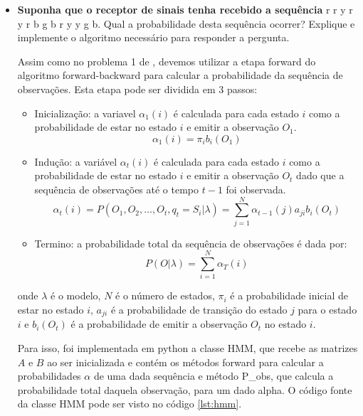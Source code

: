 \begin{itemize}
    \item \textbf{Suponha que o receptor de sinais tenha recebido a sequência}
    r r y r y r b g b r y y g b. Qual a probabilidade desta sequência ocorrer? Explique e implemente o algoritmo necessário para responder a pergunta.
    \begin{tcolorbox}[title=Resposta:]
        Assim como no problema 1 de \cite{Rabiner1989}, devemos utilizar a etapa forward do algoritmo forward-backward para calcular a probabilidade da sequência de observações. Esta etapa pode ser dividida em 3 passos:

        \begin{itemize}
            \item Inicialização: a variavel \( \alpha_1(i) \) é calculada para cada estado \( i \) como a probabilidade de estar no estado \( i \) e emitir a observação \( O_1 \).
            \begin{equation}
                \alpha_1(i) = \pi_i b_i(O_1)
            \end{equation}
            \item Indução: a variável \( \alpha_t(i) \) é calculada para cada estado \( i \) como a probabilidade de estar no estado \( i \) e emitir a observação \( O_t \) dado que a sequência de observações até o tempo \( t-1 \) foi observada.
            \begin{equation}
                \alpha_t(i) = P(O_1, O_2, \ldots, O_t, q_t = S_i | \lambda) = \sum_{j=1}^{N} \alpha_{t-1}(j) a_{ji} b_i(O_t)
            \end{equation} 
            \item Termino: a probabilidade total da sequência de observações é dada por:
            \begin{equation}
                P(O |  \lambda) = \sum_{i=1}^{N} \alpha_T(i)
            \end{equation}
        \end{itemize}

        onde \(  \lambda \) é o modelo, \( N \) é o número de estados, \( \pi_i \) é a probabilidade inicial de estar no estado \( i \), \( a_{ji} \) é a probabilidade de transição do estado \( j \) para o estado \( i
        \) e \( b_i(O_t) \) é a probabilidade de emitir a observação \( O_t \) no estado \( i \).

        Para isso, foi implementada em python a classe HMM, que recebe as matrizes \( A \) e \( B \) ao ser inicializada e contém os métodos forward para calcular a probabilidades \(\alpha\) de uma dada sequência e método P\_obs, que calcula a probabilidade total daquela observação, para um dado alpha. O código fonte da classe HMM pode ser visto no código \ref{lst:hmm}.
    \end{tcolorbox}


\end{itemize}
